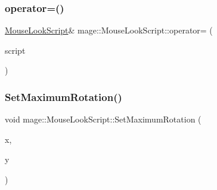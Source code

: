 \hypertarget{classmage_1_1_mouse_look_script_a2754174f5595fa424471c631818dc2b6}{}\label{classmage_1_1_mouse_look_script_a2754174f5595fa424471c631818dc2b6} 
\subsubsection{\texorpdfstring{operator=()}{operator=()}\hspace{0.1cm}{\footnotesize\ttfamily [2/2]}}
{\footnotesize\ttfamily \hyperlink{classmage_1_1_mouse_look_script}{Mouse\+Look\+Script}\& mage\+::\+Mouse\+Look\+Script\+::operator= (\begin{DoxyParamCaption}\item[{\hyperlink{classmage_1_1_mouse_look_script}{Mouse\+Look\+Script} \&\&}]{script }\end{DoxyParamCaption})\hspace{0.3cm}{\ttfamily [delete]}}

\hypertarget{classmage_1_1_mouse_look_script_a2e9d5982a1d650af143b06ed1d8ccde2}{}\label{classmage_1_1_mouse_look_script_a2e9d5982a1d650af143b06ed1d8ccde2} 
\subsubsection{\texorpdfstring{Set\+Maximum\+Rotation()}{SetMaximumRotation()}\hspace{0.1cm}{\footnotesize\ttfamily [1/3]}}
{\footnotesize\ttfamily void mage\+::\+Mouse\+Look\+Script\+::\+Set\+Maximum\+Rotation (\begin{DoxyParamCaption}\item[{float}]{x,  }\item[{float}]{y }\end{DoxyParamCaption})}

\hypertarget{classmage_1_1_mouse_look_script_a551e76e245258b879f229e4e86a91650}{}\label{classmage_1_1_mouse_look_script_a551e76e245258b879f229e4e86a91650} 
